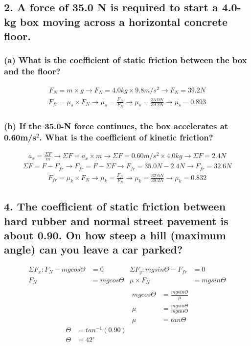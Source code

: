 \documentclass[12pt,a4paper,english]{article}
\begin{document}
\begin{flushleft}
  \subsection{2. A force of 35.0 N is required to start a 4.0-kg box moving across a horizontal concrete floor.}
  \subsubsection{(a) What is the coefficient of static friction between the box and the floor?}
  \begin{align*}
    F_N=m\times g \rightarrow
    F_N=4.0kg\times 9.8m/s^2\rightarrow
    F_N=39.2N
  \end{align*}
  \begin{align*}
    F_{fr}=\mu_s \times F_N \rightarrow
    \mu_s=\frac{F_{fr}}{F_N}\rightarrow
    \mu_s=\frac{35.0N}{39.2N}\rightarrow
    \mu_s=0.893
  \end{align*}
  \subsubsection{(b) If the 35.0-N force continues, the box accelerates at 0.60m/s$^2$. What is the coefficient of kinetic friction?}
  \begin{align*}
    a_x=\frac{\Sigma F}{m}\rightarrow
    \Sigma F=a_x\times m \rightarrow
    \Sigma F=0.60m/s^2\times4.0kg\rightarrow
    \Sigma F=2.4N
  \end{align*}
  \begin{align*}
    \Sigma F=F-F_{fr}\rightarrow
    F_{fr}=F-\Sigma F\rightarrow
    F_{fr}=35.0N-2.4N\rightarrow
    F_{fr}=32.6N
  \end{align*}
  \begin{align*}
    F_{fr}=\mu_k\times F_N\rightarrow
    \mu_k=\frac{F_{fr}}{F_N}\rightarrow
    \mu_k=\frac{32.6N}{39.2N}\rightarrow
    \mu_k=0.832
  \end{align*}
  \subsection{4. The coefficient of static friction between hard rubber and normal street pavement is about 0.90. On how steep a hill (maximum angle) can you leave a car parked?}
  \begin{align*}
    \Sigma F_x:F_N-mgcos\Theta&=0 &\Sigma F_y:mgsin\Theta-F_{fr}&=0
    \\
    F_N&=mgcos\Theta &\mu\times F_N&=mgsin\Theta
    \\
  \end{align*}
  \begin{align*}
    &&mgcos\Theta&=\frac{mgsin\Theta}{\mu}
    \\
    &&\mu&=\frac{mgsin\Theta}{mgcos\Theta}
    \\
    &&\mu&=tan\Theta
    \\
    \Theta&=tan^{-1}(0.90)
    \\
    \Theta&=42^\circ
  \end{align*}

\end{flushleft}
\end{document}
